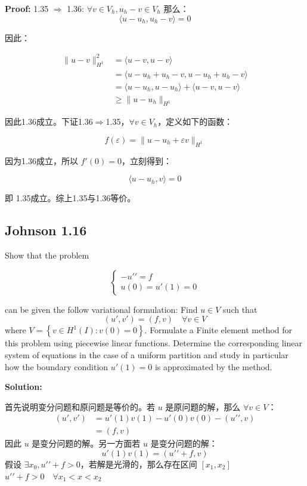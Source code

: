 \documentclass[UTF8]{ctexart}
\begin{document}
\textbf{Proof:} 1.35 \(\Rightarrow\) 1.36:
\(\forall v \in V_{h},u_{h} - v \in V_{h}\) 那么：
\[{\langle u - u_{h},u_{h} - v\rangle} = 0\]

因此：

\[\begin{aligned}
\left. \parallel{u - v} \right.\parallel_{H^{1}}^{2} & = {\langle u - v,u - v\rangle} \\
 & = {\langle u - u_{h} + u_{h} - v,u - u_{h} + u_{h} - v\rangle} \\
 & = {\langle u - u_{h},u - u_{h}\rangle} + {\langle u - v,u - v\rangle} \\
 & \geq \left. \parallel{u - u_{h}} \right.\parallel_{H^{1}}
\end{aligned}\]

因此1.36成立。下证1.36\(\Rightarrow\)1.35，\(\forall v \in V_{h}\)，定义如下的函数：

\[f(\varepsilon) = \left. \parallel{u - u_{h} + \varepsilon v} \right.\parallel_{H^{1}}\]

因为1.36成立，所以 \(f'(0) = 0\)，立刻得到：

\[{\langle u - u_{h},v\rangle} = 0\]

即 1.35成立。综上1.35与1.36等价。

\subsection{Johnson 1.16}

Show that the problem

\[\begin{cases}
 - u\prime\prime = f \\
u(0) = u\prime(1) = 0
\end{cases}\]

can be given the follow variational formulation: Find \(u \in V\) such
that \[(u\prime,v\prime) = (f,v)\quad\forall v \in V\] where
\(V = \left\{ v \in H^{1}(I):v(0) = 0 \right\}\). Formulate a Finite
element method for this problem using piecewise linear functions.
Determine the corresponding linear system of equations in the case of a
uniform partition and study in particular how the boundary condition
\(u\prime(1) = 0\) is approximated by the method.

\textbf{Solution:}

首先说明变分问题和原问题是等价的。若 \(u\) 是原问题的解，那么
\(\forall v \in V\)： \[\begin{aligned}
(u\prime,v\prime) & = u\prime(1)v(1) - u\prime(0)v(0) - (u\prime\prime,v) \\
 & = (f,v)
\end{aligned}\] 因此 \(u\) 是变分问题的解。另一方面若 \(u\)
是变分问题的解： \[u\prime(1)v(1) = (u\prime\prime + f,v)\] 假设
\(\exists x_{0},u\prime\prime + f > 0\)，若解是光滑的，那么存在区间
\(\left\lbrack x_{1},x_{2} \right\rbrack\)
\(u\prime\prime + f > 0\quad\forall x_{1} < x < x_{2}\)
\end{document}
